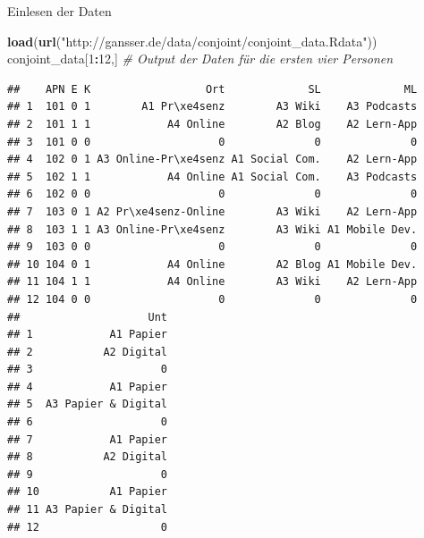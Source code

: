 \documentclass[12pt,ngerman,a4paper,ignorenonframetext,]{beamer}
\newenvironment{Shaded}{\begin{snugshade}}{\end{snugshade}}
\newcommand{\CommentTok}[1]{\textcolor[rgb]{0.56,0.35,0.01}{\textit{#1}}}
\newcommand{\DecValTok}[1]{\textcolor[rgb]{0.00,0.00,0.81}{#1}}
\newcommand{\KeywordTok}[1]{\textcolor[rgb]{0.13,0.29,0.53}{\textbf{#1}}}
\newcommand{\NormalTok}[1]{#1}
\newcommand{\OperatorTok}[1]{\textcolor[rgb]{0.81,0.36,0.00}{\textbf{#1}}}
\newcommand{\StringTok}[1]{\textcolor[rgb]{0.31,0.60,0.02}{#1}}
\begin{document}
\begin{frame}{Einlesen der Daten}
\protect\hypertarget{einlesen-der-daten}{}

\begin{Shaded}
\begin{Highlighting}[]
\KeywordTok{load}\NormalTok{(}\KeywordTok{url}\NormalTok{(}\StringTok{"http://gansser.de/data/conjoint/conjoint_data.Rdata"}\NormalTok{))}
\NormalTok{conjoint_data[}\DecValTok{1}\OperatorTok{:}\DecValTok{12}\NormalTok{,] }\CommentTok{# Output der Daten für die ersten vier Personen}
\end{Highlighting}
\end{Shaded}

\begin{verbatim}
##    APN E K                  Ort             SL             ML
## 1  101 0 1        A1 Pr\xe4senz        A3 Wiki    A3 Podcasts
## 2  101 1 1            A4 Online        A2 Blog    A2 Lern-App
## 3  101 0 0                    0              0              0
## 4  102 0 1 A3 Online-Pr\xe4senz A1 Social Com.    A2 Lern-App
## 5  102 1 1            A4 Online A1 Social Com.    A3 Podcasts
## 6  102 0 0                    0              0              0
## 7  103 0 1 A2 Pr\xe4senz-Online        A3 Wiki    A2 Lern-App
## 8  103 1 1 A3 Online-Pr\xe4senz        A3 Wiki A1 Mobile Dev.
## 9  103 0 0                    0              0              0
## 10 104 0 1            A4 Online        A2 Blog A1 Mobile Dev.
## 11 104 1 1            A4 Online        A3 Wiki    A2 Lern-App
## 12 104 0 0                    0              0              0
##                    Unt
## 1            A1 Papier
## 2           A2 Digital
## 3                    0
## 4            A1 Papier
## 5  A3 Papier & Digital
## 6                    0
## 7            A1 Papier
## 8           A2 Digital
## 9                    0
## 10           A1 Papier
## 11 A3 Papier & Digital
## 12                   0
\end{verbatim}

\end{frame}
\end{document}
